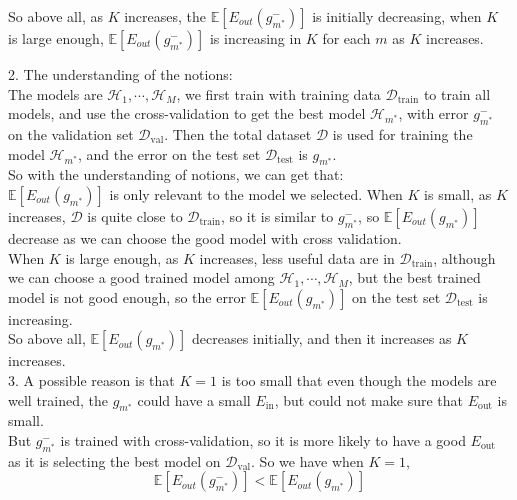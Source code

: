 So above all, as $K$ increases, the $\mathbb{E}[E_{out}(g^-_{m^*})]$ is initially decreasing, when $K$ is large enough, $\mathbb{E}[E_{out}(g^-_{m^*})]$ is increasing in $K$ for each $m$ as $K$ increases.

2. The understanding of the notions:\\
The models are $\mathcal{H}_1,\cdots,\mathcal{H}_M$, we first train with training data $\mathcal{D}_{\text{train}}$ to train all models, and use the cross-validation to get the best model $\mathcal{H}_{m^*}$, with error $g^-_{m^*}$ on the validation set $\mathcal{D}_{\text{val}}$. Then the total dataset $\mathcal{D}$ is used for training the model $\mathcal{H}_{m^*}$, and the error on the test set $\mathcal{D}_{\text{test}}$ is $g_{m^*}$.\\
So with the understanding of notions, we can get that:\\
$\mathbb{E}[E_{out}(g_{m^*})]$ is only relevant to the model we selected. When $K$ is small, as $K$ increases, $\mathcal{D}$ is quite close to $\mathcal{D}_{\text{train}}$, so it is similar to $g^-_{m^*}$, so $\mathbb{E}[E_{out}(g_{m^*})]$ decrease as we can choose the good model with cross validation.\\
When $K$ is large enough, as $K$ increases, less useful data are in $\mathcal{D}_{\text{train}}$, although we can choose a good trained model among $\mathcal{H}_1,\cdots,\mathcal{H}_M$, but the best trained model is not good enough, so the error $\mathbb{E}[E_{out}(g_{m^*})]$ on the test set $\mathcal{D}_{\text{test}}$ is increasing.\\

So above all, $\mathbb{E}[E_{out}(g_{m^*})]$ decreases initially, and then it increases as $K$ increases.\\

3. A possible reason is that $K=1$ is too small that even though the models are well trained, the $g_{m^*}$ could have a small $E_{\text{in}}$, but could not make sure that $E_{\text{out}}$ is small.\\
But $g^-_{m^*}$ is trained with cross-validation, so it is more likely to have a good $E_{\text{out}}$ as it is selecting the best model on $\mathcal{D}_{\text{val}}$.
So we have when $K=1$,
$$\mathbb{E}[E_{out}(g^-_{m^*})]<\mathbb{E}[E_{out}(g_{m^*})]$$

\newpage